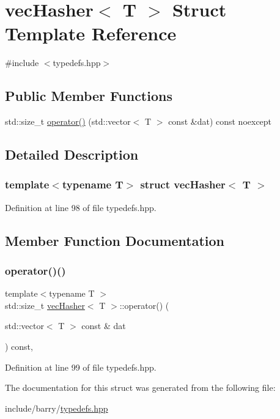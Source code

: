 \hypertarget{structvec_hasher}{}\section{vec\+Hasher$<$ T $>$ Struct Template Reference}
\label{structvec_hasher}


{\ttfamily \#include $<$typedefs.\+hpp$>$}

\subsection*{Public Member Functions}
\begin{DoxyCompactItemize}
\item 
std\+::size\+\_\+t \hyperlink{structvec_hasher_ae8127d9b7d302fe59bd64e7067e7ba61}{operator()} (std\+::vector$<$ T $>$ const \&dat) const noexcept
\end{DoxyCompactItemize}


\subsection{Detailed Description}
\subsubsection*{template$<$typename T$>$\newline
struct vec\+Hasher$<$ T $>$}



Definition at line 98 of file typedefs.\+hpp.



\subsection{Member Function Documentation}
\mbox{\label{structvec_hasher_ae8127d9b7d302fe59bd64e7067e7ba61}} 
\subsubsection{\texorpdfstring{operator()()}{operator()()}}
{\footnotesize\ttfamily template$<$typename T $>$ \\
std\+::size\+\_\+t \hyperlink{structvec_hasher}{vec\+Hasher}$<$ T $>$\+::operator() (\begin{DoxyParamCaption}\item[{std\+::vector$<$ T $>$ const \&}]{dat }\end{DoxyParamCaption}) const\hspace{0.3cm}{\ttfamily [inline]}, {\ttfamily [noexcept]}}



Definition at line 99 of file typedefs.\+hpp.



The documentation for this struct was generated from the following file\+:\begin{DoxyCompactItemize}
\item 
include/barry/\hyperlink{typedefs_8hpp}{typedefs.\+hpp}\end{DoxyCompactItemize}
